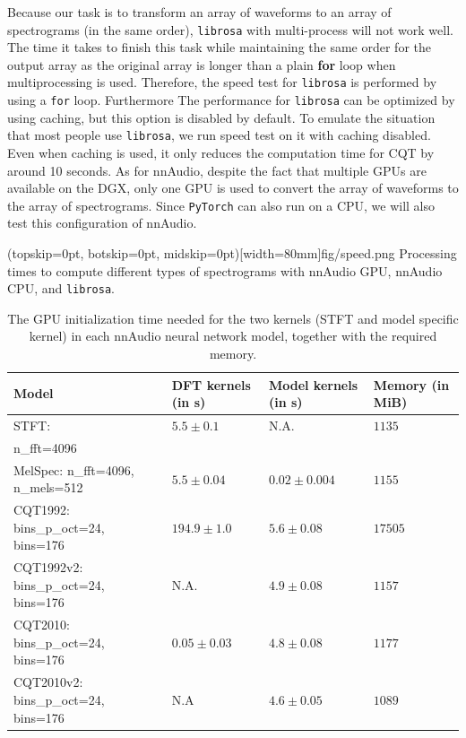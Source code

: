 \documentclass{ieeeaccess}
\newcommand{\nbh}[1]{\texttt{#1}}
\begin{document}
Because our task is to transform an array of waveforms to an array of spectrograms (in the same order), \nbh{librosa} with multi-process will not work well. The time it takes to finish this task while maintaining the same order for the output array as the original array is longer than a plain \textbf{for} loop when multiprocessing is used. Therefore, the speed test for \nbh{librosa} is performed by using a \nbh{for} loop. Furthermore The performance for \nbh{librosa} can be optimized by using caching, but this option is disabled by default. To emulate the situation that most people use \nbh{librosa}, we run speed test on it with caching disabled. Even when caching is used, it only reduces the computation time for CQT by around 10 seconds. As for nnAudio, despite the fact that multiple GPUs are available on the DGX, only one GPU is used to convert the array of waveforms to the array of spectrograms. Since \nbh{PyTorch} can also run on a CPU, we will also test this configuration of nnAudio. 


\Figure(topskip=0pt, botskip=0pt, midskip=0pt)[width=80mm]{fig/speed.png}
{Processing times to compute different types of spectrograms with nnAudio GPU, nnAudio CPU, and \nbh{librosa}. \label{fig:speed}}




\begin{table}[h!]
\caption{The GPU initialization time needed for the two kernels (STFT and model specific kernel) in each nnAudio neural network model, together with the required memory. }
\centering
\label{tab: mem}
\setlength{\tabcolsep}{5pt}
\begin{tabular}{p{60pt} p{45pt} p{45pt} p{35pt}}
\toprule
Model& 
DFT kernels (in s)& 
Model kernels (in s) & Memory (in MiB)\\\midrule
STFT:   & $5.5\pm 0.1$   & N.A. & $1135$\\
n\_fft=4096 & & & \\\hdashline
MelSpec:  n\_fft=4096, n\_mels=512 & $5.5\pm 0.04$  & $0.02\pm 0.004$ & $1155$\\\hdashline
CQT1992: bins\_p\_oct=24, bins=176  & $194.9\pm 1.0$ & $5.6 \pm 0.08$ & $17505$\\\hdashline
CQT1992v2: bins\_p\_oct=24, bins=176& N.A.           & $4.9 \pm 0.08$ & $1157$\\\hdashline
CQT2010: bins\_p\_oct=24, bins=176  & $0.05\pm 0.03$ & $4.8\pm 0.08$ & $1177$\\\hdashline
CQT2010v2: bins\_p\_oct=24, bins=176& N.A            & $4.6\pm 0.05$ & $1089$\\
\bottomrule
\end{tabular}
\label{tab: GPU_util}
\end{table}
\end{document}
